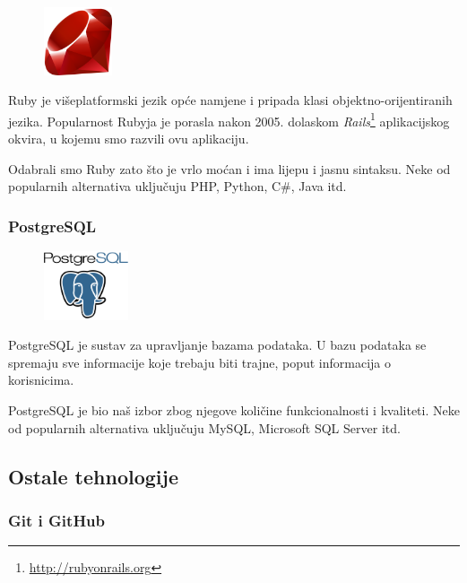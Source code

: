 \documentclass[11pt]{scrreprt}
\begin{document}
\begin{figure}
  \vspace{-10pt}
  \includegraphics[width=2cm]{logos/ruby}
  \vspace{-20pt}
\end{figure}

Ruby je višeplatformski jezik opće namjene i pripada klasi
objektno-orijentiranih jezika. Popularnost Rubyja je porasla nakon 2005.
dolaskom \emph{Rails}\footnote{\url{http://rubyonrails.org}} aplikacijskog
okvira, u kojemu smo razvili ovu aplikaciju.\cite{ruby}

Odabrali smo Ruby zato što je vrlo moćan i ima lijepu i jasnu sintaksu. Neke od
popularnih alternativa uključuju PHP, Python, C\#, Java itd.

\subsubsection{PostgreSQL}

\begin{figure}
  \vspace{-10pt}
  \includegraphics[width=2.5cm]{logos/postgresql}
  \vspace{-30pt}
\end{figure}

PostgreSQL je sustav za upravljanje bazama podataka. U bazu podataka se spremaju
sve informacije koje trebaju biti trajne, poput informacija o
korisnicima.\cite{postgresql}

PostgreSQL je bio naš izbor zbog njegove količine funkcionalnosti i kvaliteti.
Neke od popularnih alternativa uključuju MySQL, Microsoft SQL Server itd.

\pagebreak

\subsection{Ostale tehnologije}

\subsubsection{Git i GitHub}
\end{document}
